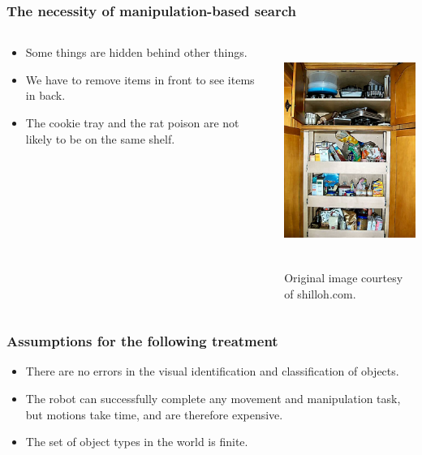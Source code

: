 \begin{frame}
  \frametitle{The necessity of manipulation-based search}
  \vspace{-0.3in}
  \begin{columns}
    \begin{column}{0.6\textwidth}
      \begin{itemize}
        \item Some things are hidden behind other things.
        \item We have to remove items in front to see items in back.
        \item The cookie tray and the rat poison are not likely to be on the same shelf.
      \end{itemize}
    \end{column}
    \begin{column}{0.4\textwidth}
      \begin{center}
        \includegraphics[height=2.7in]{img/kitchen-organization.jpg}

        \tiny{Original image courtesy of shilloh.com.}
      \end{center}
    \end{column}
  \end{columns}
\end{frame}

\begin{frame}
  \frametitle{Assumptions for the following treatment}
  \begin{itemize}
  \item There are no errors in the visual identification and classification of objects.
  \item The robot can successfully complete any movement and manipulation task,
    but motions take time, and are therefore expensive.
  \item The set of object types in the world is finite.
  \end{itemize}
\end{frame}
